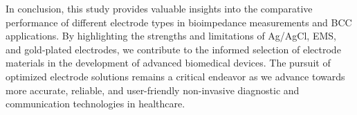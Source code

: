 \documentclass[conference]{IEEEtran}
\begin{document}
In conclusion, this study provides valuable insights into the comparative performance of different electrode types in bioimpedance measurements and BCC applications. By highlighting the strengths and limitations of Ag/AgCl, EMS, and gold-plated electrodes, we contribute to the informed selection of electrode materials in the development of advanced biomedical devices. The pursuit of optimized electrode solutions remains a critical endeavor as we advance towards more accurate, reliable, and user-friendly non-invasive diagnostic and communication technologies in healthcare.






\end{document}
